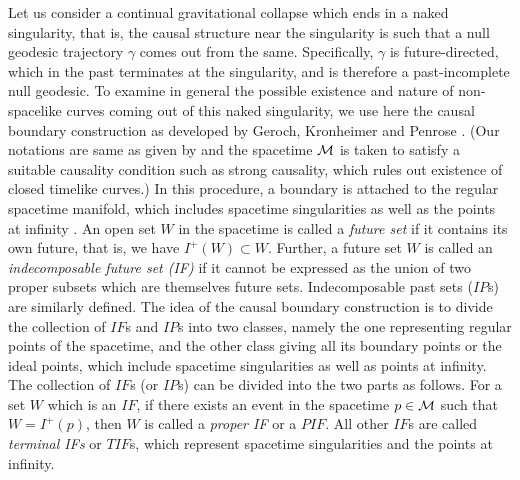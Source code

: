 \documentclass[twocolumn,aps,amsmath,amssymb,prl,showpacs,preprintnumbers]
{revtex4}
\newcommand{\M}{\ensuremath{{\cal M}}}
\begin{document}
Let us consider a continual gravitational collapse which
ends in a naked singularity, that is, the causal structure near the 
singularity is such that a null geodesic trajectory $\gamma$ 
comes out from the same. Specifically, $\gamma$ is 
future-directed, which in the past terminates at the singularity, 
and is therefore a past-incomplete null geodesic. To examine in
general the possible existence and nature of non-spacelike curves 
coming out of this naked singularity, we use here the causal 
boundary construction as developed by Geroch, Kronheimer and Penrose 
\cite{geroch}.
(Our notations are same as given by
\cite{HE}
and the spacetime $\M$ is taken to satisfy a suitable causality
condition such as strong causality, which rules out existence
of closed timelike curves.)
In this procedure, a boundary is attached to the regular 
spacetime manifold, which includes spacetime singularities as 
well as the points at infinity
\cite{rem}. 
An open set $W$ in the spacetime is 
called a {\it future set} if it contains its own future,
that is, we 
have $I^{+}(W) \subset W$. Further, a future set $W$ is called an {\it 
indecomposable future set (IF)} if it cannot be expressed as the union 
of two proper subsets which are themselves future sets. Indecomposable
past sets ($IP$s) are similarly defined. The idea of the causal 
boundary construction is to divide the collection of $IF$s and $IP$s 
into two classes, namely the one representing regular points of 
the spacetime, and the other class giving all its boundary points or 
the ideal points, which include spacetime singularities as well as
points at infinity. The collection of $IF$s (or $IP$s) can be divided 
into the two parts as follows. For a set $W$ which is an $IF$, 
if there exists 
an event in the spacetime $p\in \M$ such that $W=I^{+}(p)$, then 
$W$ is called a {\it proper IF} or a $PIF$. All other $IF$s are 
called {\it terminal IFs} or $TIF$s, which represent spacetime 
singularities and the points at infinity.          
\end{document}
